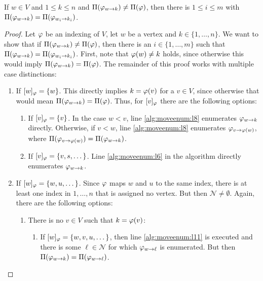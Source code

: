\begin{samepage}
    \begin{lemmarep}[Completeness]
        If $w \in V$ and $1 \leq k \leq n$ and $\Pi(\varphi_{w\rightarrow k}) \neq \Pi(\varphi)$, then there is $1 \leq i \leq m$ with $\Pi(\varphi_{w\rightarrow k}) = \Pi(\varphi_{w_i\rightarrow k_i})$.\label{lemma:completeness}
    \end{lemmarep}
\end{samepage}
\begin{proof}
    Let $\varphi$ be an indexing of $V$, let $w$ be a vertex and $k\in\{1,\dots,n\}$. We want to show that if $\Pi(\varphi_{w\rightarrow k}) \neq \Pi(\varphi)$, then there is an $i\in \{1,\dots,m\}$ such that $\Pi(\varphi_{w\rightarrow k}) = \Pi(\varphi_{w_i\rightarrow k_i})$. First, note that $\varphi(w)\neq k$ holds, since otherwise this would imply $\Pi(\varphi_{w\rightarrow k}) = \Pi(\varphi)$. The remainder of this proof works with multiple case distinctions:
    \begin{enumerate}
        \item If $[w]_\varphi = \{ w \}$. This directly implies $k = \varphi(v)$ for a $v \in V$, since otherwise that would mean $\Pi(\varphi_{w\rightarrow k}) = \Pi(\varphi)$. Thus, for $[v]_\varphi$ there are the following options:
        \begin{enumerate}
            \item If $[v]_\varphi = \{ v \}$. In the case $w < v$, line \ref{alg:moveenum:l8} enumerates $\varphi_{w\rightarrow k}$ directly.  Otherwise, if $v < w$, line \ref{alg:moveenum:l8} enumerates $\varphi_{v\rightarrow \varphi(w)}$, where $\Pi(\varphi_{v\rightarrow \varphi(w)}) = \Pi(\varphi_{w\rightarrow k})$. 
            \item If $[v]_\varphi = \{ v,s,\dots \}$. Line \ref{alg:moveenum:l6} in the algorithm directly enumerates $\varphi_{w\rightarrow k}$.
        \end{enumerate} 
        \item If $[w]_\varphi = \{ w,u, \dots \}$. Since $\varphi$ maps $w$ and $u$ to the same index, there is at least one index in $1,\dots,n$ that is assigned no vertex. But then $\mathcal{N} \neq \emptyset$. Again, there are the following options:
        \begin{enumerate}
            \item There is no $v \in V$ such that $k = \varphi(v)$: 
            \begin{enumerate}
                \item If $[w]_\varphi = \{ w,v,u,\dots \}$, then line \ref{alg:moveenum:l11} is executed and there is some $\ell \in \mathcal{N}$ for which $\varphi_{w\rightarrow \ell}$ is enumerated. But then $\Pi(\varphi_{w\rightarrow k})=\Pi(\varphi_{w\rightarrow \ell})$.

\end{enumerate}
\end{enumerate}
\end{enumerate}
\end{proof}
